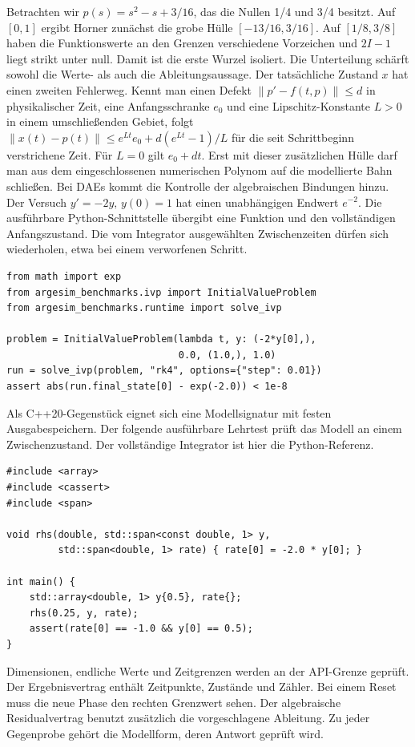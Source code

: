 Betrachten wir \(p(s)=s^2-s+3/16\), das die Nullen 1/4 und 3/4 besitzt. Auf \([0,1]\) ergibt Horner zunächst die grobe Hülle \([-13/16,3/16]\). Auf \([1/8,3/8]\) haben die Funktionswerte an den Grenzen verschiedene Vorzeichen und \(2I-1\) liegt strikt unter null. Damit ist die erste Wurzel isoliert. Die Unterteilung schärft sowohl die Werte- als auch die Ableitungsaussage.
Der tatsächliche Zustand \(x\) hat einen zweiten Fehlerweg. Kennt man einen Defekt \(\|p'-f(t,p)\|\le d\) in physikalischer Zeit, eine Anfangsschranke \(e_0\) und eine Lipschitz-Konstante \(L>0\) in einem umschließenden Gebiet, folgt \(\|x(t)-p(t)\|\le e^{Lt}e_0+d(e^{Lt}-1)/L\) für die seit Schrittbeginn verstrichene Zeit. Für \(L=0\) gilt \(e_0+dt\). Erst mit dieser zusätzlichen Hülle darf man aus dem eingeschlossenen numerischen Polynom auf die modellierte Bahn schließen. Bei DAEs kommt die Kontrolle der algebraischen Bindungen hinzu.
Der Versuch \(y'=-2y,\,y(0)=1\) hat einen unabhängigen Endwert \(e^{-2}\). Die ausführbare Python-Schnittstelle übergibt eine Funktion und den vollständigen Anfangszustand. Die vom Integrator ausgewählten Zwischenzeiten dürfen sich wiederholen, etwa bei einem verworfenen Schritt.
{\small\begin{verbatim}
from math import exp
from argesim_benchmarks.ivp import InitialValueProblem
from argesim_benchmarks.runtime import solve_ivp

problem = InitialValueProblem(lambda t, y: (-2*y[0],),
                              0.0, (1.0,), 1.0)
run = solve_ivp(problem, "rk4", options={"step": 0.01})
assert abs(run.final_state[0] - exp(-2.0)) < 1e-8
\end{verbatim}}
Als C++20-Gegenstück eignet sich eine Modellsignatur mit festen Ausgabespeichern. Der folgende ausführbare Lehrtest prüft das Modell an einem Zwischenzustand. Der vollständige Integrator ist hier die Python-Referenz.
{\small\begin{verbatim}
#include <array>
#include <cassert>
#include <span>

void rhs(double, std::span<const double, 1> y,
         std::span<double, 1> rate) { rate[0] = -2.0 * y[0]; }

int main() {
    std::array<double, 1> y{0.5}, rate{};
    rhs(0.25, y, rate);
    assert(rate[0] == -1.0 && y[0] == 0.5);
}
\end{verbatim}}
Dimensionen, endliche Werte und Zeitgrenzen werden an der API-Grenze geprüft. Der Ergebnisvertrag enthält Zeitpunkte, Zustände und Zähler. Bei einem Reset muss die neue Phase den rechten Grenzwert sehen. Der algebraische Residualvertrag benutzt zusätzlich die vorgeschlagene Ableitung. Zu jeder Gegenprobe gehört die Modellform, deren Antwort geprüft wird.
